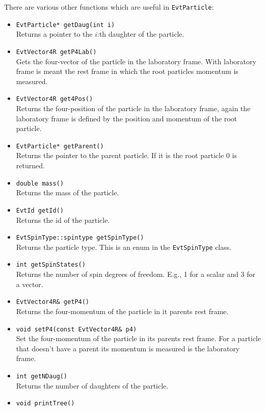 There are various other functions which are useful in {\tt EvtParticle}:
\begin{itemize}
\item {\tt  EvtParticle* getDaug(int i)}\\
      Returns a pointer to the $i$:th daughter of the particle.
\item {\tt EvtVector4R getP4Lab()}\\
      Gets the four-vector of the particle in the laboratory frame. With
      laboratory frame is meant the rest frame in which the root particles
      momentum is measured.
\item {\tt EvtVector4R get4Pos()}\\
      Returns the four-position of the particle in the laboratory frame, again
      the laboratory frame is defined by the position and momentum of the root
      particle.
\item {\tt EvtParticle* getParent()}\\
      Returns the pointer to the parent particle. If it is the root particle 0 is
      returned.
\item {\tt double mass()}\\
      Returns the mass of the particle.
\item {\tt EvtId getId()}\\
      Returns the id of the particle.
\item {\tt EvtSpinType::spintype getSpinType()}\\
      Returns the particle type. This is an enum in the {\tt EvtSpinType} class.
\item {\tt int getSpinStates()}\\
      Returns the number of spin degrees of freedom. E.g., 1 for a scalar and 3 for
      a vector.
\item {\tt EvtVector4R\& getP4()}\\
      Returns the four-momentum of the particle in it parents rest frame.
\item {\tt void setP4(const EvtVector4R\& p4) }\\
      Set the four-momentum of the particle in its parents rest frame. For a 
      particle that doesn't have a parent its momentum is measured is the laboratory
      frame.
\item {\tt int getNDaug()}\\
      Returns the number of daughters of the particle.
\item {\tt void printTree()}\\

\end{itemize}

